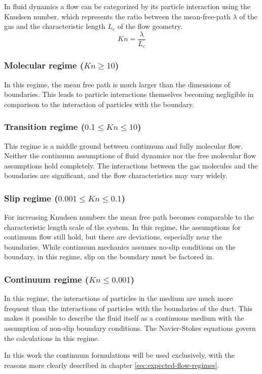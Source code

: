 	In fluid dynamics a flow can be categorized by its particle interaction using the Knudsen number, which represents the ratio between the mean-free-path $\lambda$ of the gas and the characteristic length $L_c$ of the flow geometry.
	$$
		Kn=\frac{\lambda}{L_c}
	$$

\subsubsection*{Molecular regime (\(Kn \geq 10\))}

	In this regime, the mean free path is much larger than the dimensions of boundaries.
	This leads to particle interactions themselves becoming negligible in comparison to the interaction of particles with the boundary.

	

\subsubsection*{Transition regime (\(0.1 \leq Kn \leq 10\))}
	
	This regime is a middle ground between continuum and fully molecular flow.
	Neither the continuum assumptions of fluid dynamics nor the free molecular flow assumptions hold completely.
	The interactions between the gas molecules and the boundaries are significant, and the flow characteristics may vary widely.

\subsubsection*{Slip regime (\(0.001 \leq Kn \leq 0.1\))}

	For increasing Knudsen numbers the mean free path becomes comparable to the characteristic length scale of the system.
	In this regime, the assumptions for continuum flow still hold, but there are deviations, especially near the boundaries.
	While continuum mechanics assumes no-slip conditions on the boundary, in this regime, slip on the boundary must be factored in.

	

\subsubsection*{Continuum regime (\(Kn \leq 0.001\))}
	
	In this regime, the interactions of particles in the medium are much more frequent than the interactions of particles with the boundaries of the duct.
	This makes it possible to describe the fluid itself as a continuous medium with the assumption of non-slip boundary conditions.
	The Navier-Stokes equations govern the calculations in this regime.

	

	In this work the continuum formulations will be used exclusively, with the reasons more clearly described in chapter \ref{sec:expected-flow-regimes}.
	\cite{rapp2017microfluidics}\cite{putignano2012supersonic}
